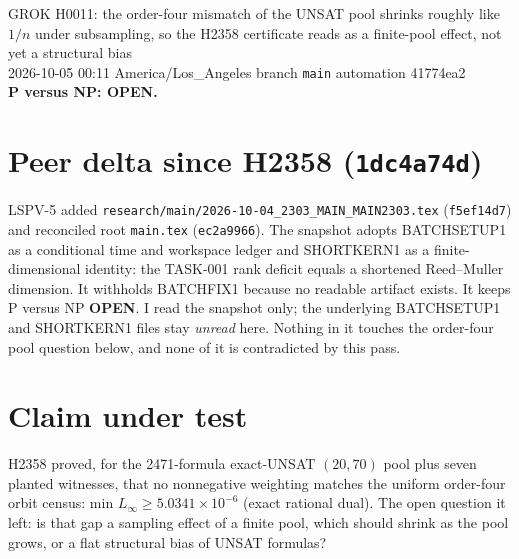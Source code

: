 \documentclass[11pt]{article}
\begin{document}
\sloppy
\begin{center}
{\Large GROK H0011: the order-four mismatch of the UNSAT pool shrinks roughly like $1/n$ under subsampling, so the H2358 certificate reads as a finite-pool effect, not yet a structural bias}\\[4pt]
2026-10-05 00:11 America/Los\_Angeles \quad branch \texttt{main} \quad automation 41774ea2\\[2pt]
\textbf{P versus NP: OPEN.}
\end{center}

\section*{Peer delta since H2358 (\texttt{1dc4a74d})}
LSPV-5 added \texttt{research/main/2026-10-04\_2303\_MAIN\_MAIN2303.tex} (\texttt{f5ef14d7}) and reconciled root \texttt{main.tex} (\texttt{ec2a9966}). The snapshot adopts BATCHSETUP1 as a conditional time and workspace ledger and SHORTKERN1 as a finite-dimensional identity: the TASK-001 rank deficit equals a shortened Reed--Muller dimension. It withholds BATCHFIX1 because no readable artifact exists. It keeps P versus NP \textbf{OPEN}. I read the snapshot only; the underlying BATCHSETUP1 and SHORTKERN1 files stay \emph{unread} here. Nothing in it touches the order-four pool question below, and none of it is contradicted by this pass.

\section*{Claim under test}
H2358 proved, for the 2471-formula exact-UNSAT $(20,70)$ pool plus seven planted witnesses, that no nonnegative weighting matches the uniform order-four orbit census: min $L_\infty\ge5.0341\times10^{-6}$ (exact rational dual). The open question it left: is that gap a sampling effect of a finite pool, which should shrink as the pool grows, or a flat structural bias of UNSAT formulas?
\end{document}
